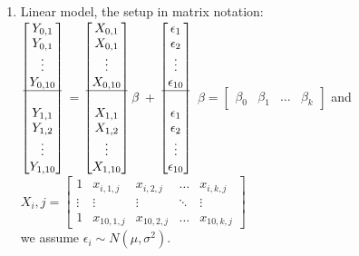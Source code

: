 \documentclass{article}
\begin{document}
\begin{enumerate}
\item Linear model, the setup in matrix notation: \\
$ \begin{bmatrix}
Y_{0,1} \\
Y_{0,1} \\
\vdots \\
Y_{0,10} \\
\hline \\
Y_{1,1} \\
Y_{1,2} \\
\vdots \\
Y_{1,10} \\
\end{bmatrix} $ = 
$ \begin{bmatrix}
X_{0,1} \\
X_{0,1} \\
\vdots \\
X_{0,10} \\
\hline \\
X_{1,1} \\
X_{1,2} \\
\vdots \\
X_{1,10} \\
\end{bmatrix} \beta $ + 
$ \begin{bmatrix}
\epsilon_{1} \\
\epsilon_{2} \\
\vdots \\
\epsilon_{10} \\
\hline \\
\epsilon_{1} \\
\epsilon_{2} \\
\vdots \\
\epsilon_{10} \\
\end{bmatrix} $ 
$ \beta = \begin{bmatrix} 
\beta_0 & \beta_1 & \dots & \beta_k
\end{bmatrix} $ 
and $ X_i,j = \begin{bmatrix}
1 & x_{i,1,j} & x_{i,2,j} & \dots & x_{i,k,j} \\
\vdots & \vdots & \vdots & \ddots & \vdots \\
1 & x_{10, 1, j} & x_{10, 2, j} & \hdots & x_{10,k,j} 
\end{bmatrix}  $ \\
we assume $ \epsilon_i \sim N(\mu, \sigma^2) $.


\end{enumerate}
\end{document}
